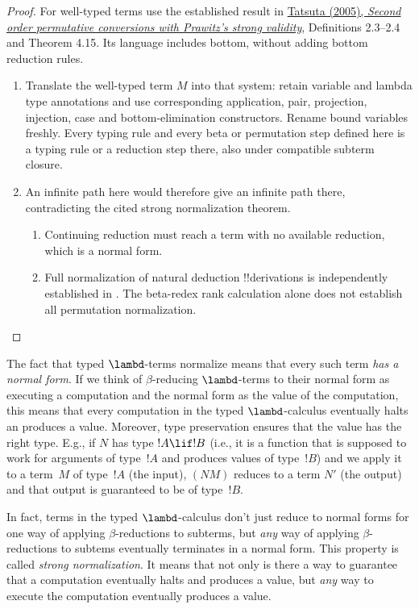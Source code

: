 \documentclass[../../../include/open-logic-section]{subfiles}
\begin{document}
\begin{proof}
  For well-typed terms use the established result in
  \href{https://doi.org/10.2201/NiiPi.2005.2.4}{Tatsuta (2005),
  \emph{Second order permutative conversions with Prawitz's strong validity}},
  Definitions 2.3--2.4 and Theorem 4.15. Its language includes bottom,
  without adding bottom reduction rules.
  \begin{enumerate}

  \item Translate the well-typed term $M$ into that system:
  retain variable and lambda type annotations and use corresponding
  application, pair, projection, injection, case and bottom-elimination
  constructors. Rename bound variables freshly. Every typing rule and
  every beta or permutation step defined here is a typing rule or a
  reduction step there, also under compatible subterm closure.
  \item An infinite path here would therefore give an infinite path
  there, contradicting the cited strong normalization theorem.
  \begin{enumerate}
  \item Continuing reduction must reach a term with no available
  reduction, which is a normal form.

  \item Full normalization of natural deduction !!{derivation}s is
  independently established in
  .
  The beta-redex rank calculation alone does not establish all
  permutation normalization.
  \end{enumerate}
  \end{enumerate}
\end{proof}

The fact that typed $\lambd$-terms normalize means that every such
term \emph{has a normal form}. If we think of $\beta$-reducing
$\lambd$-terms to their normal form as executing a computation and the
normal form as the value of the computation, this means that every
computation in the typed $\lambd$-calculus eventually halts an
produces a value. Moreover, type preservation ensures that the value
has the right type. E.g., if $N$ has type $!A \lif !B$ (i.e., it is a
function that is supposed to work for arguments of type~$!A$ and
produces values of type~$!B$) and we apply it to a term~$M$ of type~$!A$
(the input), $(NM)$ reduces to a term $N'$ (the output) and that
output is guaranteed to be of type~$!B$.

In fact, terms in the typed $\lambd$-calculus don't just reduce to
normal forms for one way of applying $\beta$-reductions to subterms,
but \emph{any} way of applying $\beta$-reductions to subtems
eventually terminates in a normal form. This property is called
\emph{strong normalization}. It means that not only is there a way to
guarantee that a computation eventually halts and produces a value,
but \emph{any} way to execute the computation eventually produces a
value.
\end{document}
